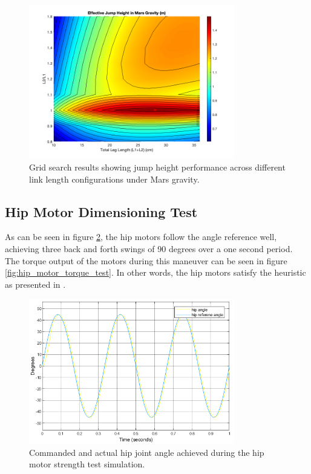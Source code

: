 \begin{figure}[h]
    \centering
    \includegraphics[width=0.8\textwidth]{Images/results/grid_search_mars.png}
    \caption{Grid search results showing jump height performance across different link length configurations under Mars gravity.}
    \label{fig:results:grid_search_mars}
\end{figure}


\subsection{Hip Motor Dimensioning Test}
\label{sec:hip_motor_dimensioning_test}

As can be seen in figure \ref{fig:hip_motor_strength_test}, the hip motors follow the angle reference well, achieving three back and forth swings of 90 degrees over a one second period. The torque output of the motors during this maneuver can be seen in figure \ref{fig:hip_motor_torque_test}. In other words, the hip motors satisfy the heuristic as presented in \cite{finn_tarek_master}.

\begin{figure}[H]
    \centering
    \includegraphics[width=0.8\textwidth]{Images/paw_swing_test.png}
    \caption{Commanded and actual hip joint angle achieved during the hip motor strength test simulation. }
    \label{fig:hip_motor_strength_test}
\end{figure}

